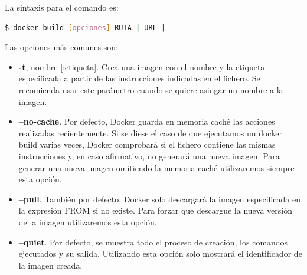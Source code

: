 La sintaxis para el comando es:

\begin{lstlisting}[language=bash]
$ docker build [opciones] RUTA | URL | -
\end{lstlisting}


Las opciones más comunes son:
\begin{itemize}
	\item \textbf{-t}, nombre [:etiqueta]. Crea una imagen con el nombre y la etiqueta especificada a partir de las instrucciones indicadas en el fichero. Se recomienda usar este parámetro cuando se quiere asingar un nombre a la imagen.
	\item \textbf{–no-cache}. Por defecto, Docker guarda en memoria caché las acciones realizadas recientemente. Si se diese el caso de que ejecutamos un docker build varias veces, Docker comprobará si el fichero contiene las mismas instrucciones y, en caso afirmativo, no generará una nueva imagen. Para generar una nueva imagen omitiendo la memoria caché utilizaremos siempre esta opción.
	\item \textbf{–pull}. También por defecto. Docker solo descargará la imagen especificada en la expresión FROM si no existe. Para forzar que descargue la nueva versión de la imagen utilizaremos esta opción.
	\item \textbf{–quiet}. Por defecto, se muestra todo el proceso de creación, los comandos ejecutados y su salida. Utilizando esta opción solo mostrará el identificador de la imagen creada.
\end{itemize}

